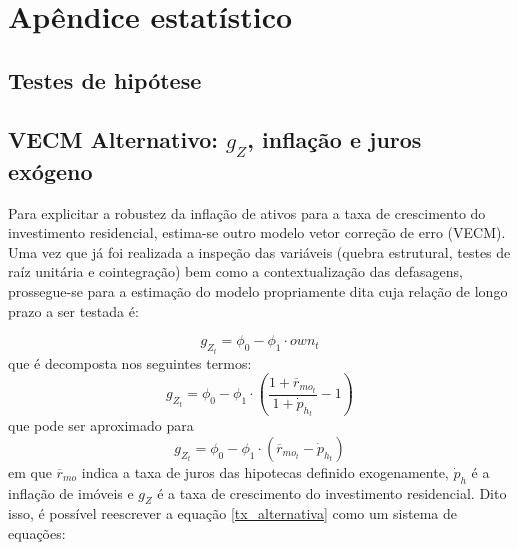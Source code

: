 \titleformat{\chapter}[display]{\normalfont\huge}{\appendixname{} \thechapter}{20pt}{\bfseries\huge}
\chapter{Apêndice estatístico}
\label{Append_Stat}

\section{Testes de hipótese}









\section{VECM Alternativo: $g_Z$, inflação e juros exógeno}

Para explicitar a robustez da inflação de ativos para a taxa de crescimento do investimento residencial, estima-se outro modelo vetor correção de erro (VECM).
Uma vez que já foi realizada a inspeção das variáveis (quebra estrutural, testes de raíz unitária e cointegração) bem como a contextualização das defasagens, prossegue-se para a estimação do modelo propriamente dita cuja relação de longo prazo a ser testada é:

$$
g_{Z_t} = \phi_{0} - \phi_1\cdot own_t
$$
que é decomposta nos seguintes termos:
$$
g_{Z_t} = \phi_{0} - \phi_1\cdot \left(\frac{1+\overline r_{mo_t}}{1+\dot p_{h_t}} -1\right)
$$
que pode ser aproximado para
\begin{equation}
\label{tx_alternativa}
g_{Z_t} = \phi_{0} - \phi_1\cdot \left(\overline r_{mo_ t} - \dot p_{h_t}\right)
\end{equation}
em que $\overline r_{mo}$ indica a taxa de juros das hipotecas definido exogenamente, $\dot p_h$ é a inflação de imóveis e $g_Z$ é a taxa de crescimento do investimento residencial.
Dito isso, é possível reescrever a equação \ref{tx_alternativa} como um sistema de equações:

